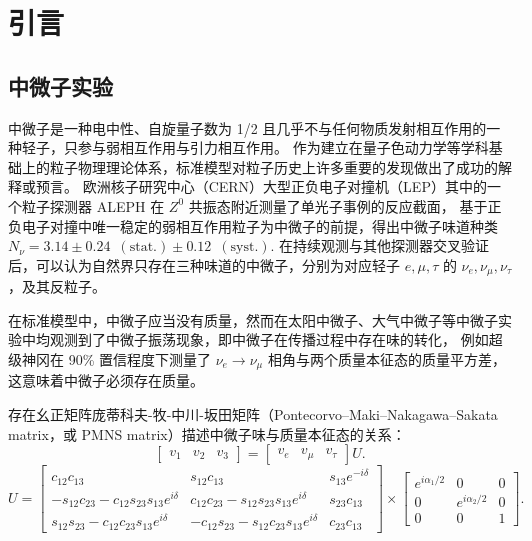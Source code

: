 
\chapter{引言}

\section{中微子实验}
中微子是一种电中性、自旋量子数为 1/2 且几乎不与任何物质发射相互作用的一种轻子，只参与弱相互作用与引力相互作用。
作为建立在量子色动力学等学科基础上的粒子物理理论体系，标准模型对粒子历史上许多重要的发现做出了成功的解释或预言。
欧洲核子研究中心（CERN）大型正负电子对撞机（LEP）其中的一个粒子探测器 ALEPH 在 $Z^0$ 共振态附近测量了单光子事例的反应截面\cite{DECAMP1989519}，
基于正负电子对撞中唯一稳定的弱相互作用粒子为中微子的前提，得出中微子味道种类 $N_\nu=3.14\pm0.24\enspace(\text{stat.})\pm0.12\enspace(\text{syst.})$.
在持续观测与其他探测器交叉验证后，可以认为自然界只存在三种味道的中微子，分别为对应轻子 $e,\mu,\tau$ 的 $\nu_e,\nu_\mu,\nu_\tau$，及其反粒子。

在标准模型中，中微子应当没有质量，然而在太阳中微子、大气中微子等中微子实验中均观测到了中微子振荡现象，即中微子在传播过程中存在味的转化，
例如超级神冈在 90\% 置信程度下测量了 $\nu_e\rightarrow\nu_\mu$ 相角与两个质量本征态的质量平方差\cite{fukudaEvidenceOscillationAtmospheric1998}，
这意味着中微子必须存在质量。

存在幺正矩阵庞蒂科夫-牧-中川-坂田矩阵（Pontecorvo–Maki–Nakagawa–Sakata matrix，或 PMNS matrix）描述中微子味与质量本征态的关系：
\begin{equation}
    \begin{bmatrix}
        v_1&v_2&v_3
    \end{bmatrix}
    =
    \begin{bmatrix}
        v_e&v_\mu&v_\tau
    \end{bmatrix}U.
\end{equation}
\begin{equation}
    U=
    \begin{bmatrix}
    c_{12}c_{13}&s_{12}c_{13}&s_{13}e^{-i\delta}\\-s_{12}c_{23}-c_{12}s_{23}s_{13}e^{i\delta}&c_{12}c_{23}-s_{12}s_{23}s_{13}e^{i\delta}&s_{23}c_{13}\\s_{12}s_{23}-c_{12}c_{23}s_{13}e^{i\delta}&-c_{12}s_{23}-s_{12}c_{23}s_{13}e^{i\delta}&c_{23}c_{13}
    \end{bmatrix}
    \times 
    \begin{bmatrix}
    e^{i\alpha_1/2}&0&0\\0&e^{i\alpha_2/2}&0\\0&0&1
    \end{bmatrix}.
\end{equation}

